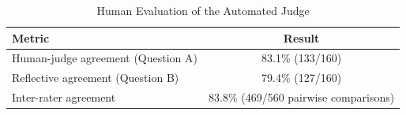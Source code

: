 \begin{table}[H]
\centering
\caption{Human Evaluation of the Automated Judge}
\begin{tabular}{lc}
\hline
\textbf{Metric} & \textbf{Result} \\
\hline
Human-judge agreement (Question A) & 83.1\% (133/160) \\
Reflective agreement (Question B)  & 79.4\% (127/160) \\
Inter-rater agreement              & 83.8\% (469/560 pairwise comparisons) \\
\hline
\end{tabular}
\end{table}
